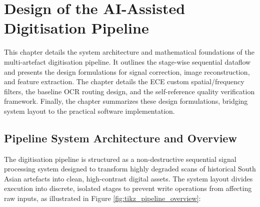 \chapter{Design of the AI-Assisted Digitisation Pipeline}

This chapter details the system architecture and mathematical foundations of the multi-artefact digitisation pipeline. It outlines the stage-wise sequential dataflow and presents the design formulations for signal correction, image reconstruction, and feature extraction. The chapter details the ECE custom spatial/frequency filters, the baseline OCR routing design, and the self-reference quality verification framework. Finally, the chapter summarizes these design formulations, bridging system layout to the practical software implementation.

\section{Pipeline System Architecture and Overview}

The digitisation pipeline is structured as a non-destructive sequential signal processing system designed to transform highly degraded scans of historical South Asian artefacts into clean, high-contrast digital assets. The system layout divides execution into discrete, isolated stages to prevent write operations from affecting raw inputs, as illustrated in Figure \ref{fig:tikz_pipeline_overview}:

